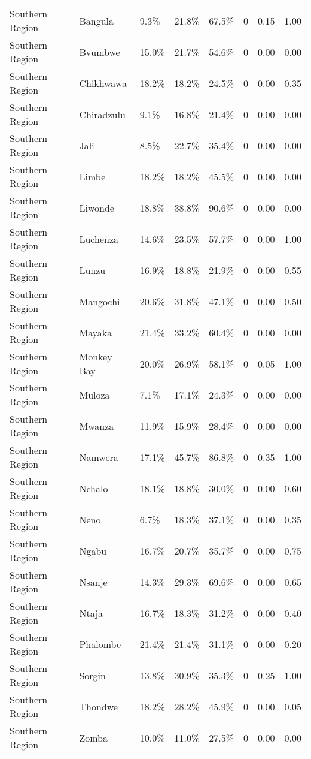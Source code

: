 \begin{table}[ht]
\begin{tabular}{lllllrrr}
  Southern Region & Bangula & 9.3\% & 21.8\% & 67.5\% & 0 & 0.15 & 1.00 \\ 
  Southern Region & Bvumbwe & 15.0\% & 21.7\% & 54.6\% & 0 & 0.00 & 0.00 \\ 
  Southern Region & Chikhwawa & 18.2\% & 18.2\% & 24.5\% & 0 & 0.00 & 0.35 \\ 
  Southern Region & Chiradzulu & 9.1\% & 16.8\% & 21.4\% & 0 & 0.00 & 0.00 \\ 
  Southern Region & Jali & 8.5\% & 22.7\% & 35.4\% & 0 & 0.00 & 0.00 \\ 
  Southern Region & Limbe & 18.2\% & 18.2\% & 45.5\% & 0 & 0.00 & 0.00 \\ 
  Southern Region & Liwonde & 18.8\% & 38.8\% & 90.6\% & 0 & 0.00 & 0.00 \\ 
  Southern Region & Luchenza & 14.6\% & 23.5\% & 57.7\% & 0 & 0.00 & 1.00 \\ 
  Southern Region & Lunzu & 16.9\% & 18.8\% & 21.9\% & 0 & 0.00 & 0.55 \\ 
  Southern Region & Mangochi & 20.6\% & 31.8\% & 47.1\% & 0 & 0.00 & 0.50 \\ 
  Southern Region & Mayaka & 21.4\% & 33.2\% & 60.4\% & 0 & 0.00 & 0.00 \\ 
  Southern Region & Monkey Bay & 20.0\% & 26.9\% & 58.1\% & 0 & 0.05 & 1.00 \\ 
  Southern Region & Muloza & 7.1\% & 17.1\% & 24.3\% & 0 & 0.00 & 0.00 \\ 
  Southern Region & Mwanza & 11.9\% & 15.9\% & 28.4\% & 0 & 0.00 & 0.00 \\ 
  Southern Region & Namwera & 17.1\% & 45.7\% & 86.8\% & 0 & 0.35 & 1.00 \\ 
  Southern Region & Nchalo & 18.1\% & 18.8\% & 30.0\% & 0 & 0.00 & 0.60 \\ 
  Southern Region & Neno & 6.7\% & 18.3\% & 37.1\% & 0 & 0.00 & 0.35 \\ 
  Southern Region & Ngabu & 16.7\% & 20.7\% & 35.7\% & 0 & 0.00 & 0.75 \\ 
  Southern Region & Nsanje & 14.3\% & 29.3\% & 69.6\% & 0 & 0.00 & 0.65 \\ 
  Southern Region & Ntaja & 16.7\% & 18.3\% & 31.2\% & 0 & 0.00 & 0.40 \\ 
  Southern Region & Phalombe & 21.4\% & 21.4\% & 31.1\% & 0 & 0.00 & 0.20 \\ 
  Southern Region & Sorgin & 13.8\% & 30.9\% & 35.3\% & 0 & 0.25 & 1.00 \\ 
  Southern Region & Thondwe & 18.2\% & 28.2\% & 45.9\% & 0 & 0.00 & 0.05 \\ 
  Southern Region & Zomba & 10.0\% & 11.0\% & 27.5\% & 0 & 0.00 & 0.00 \\ 
   \hline
\end{tabular}
\end{table}
